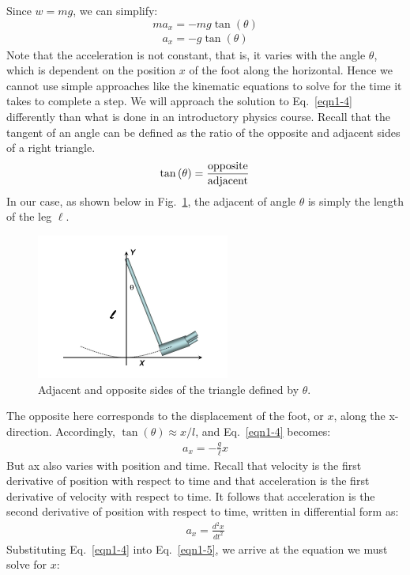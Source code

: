 Since $w=mg$, we can simplify:
$$ma_x = -mg \tan\left(\theta\right)$$       
\begin{eqnarray}\label{eqn1-4}
a_x = -g \tan\left(\theta\right)             
\end{eqnarray}
Note that the acceleration is not constant, that is, it varies with the angle $\theta$, which is dependent on the position $x$ of the foot along the horizontal. Hence we cannot use simple approaches like the kinematic equations to solve for the time it takes to complete a step.  We will approach the solution to Eq.~\ref{eqn1-4} differently than what is done in an introductory physics course. 
Recall that the tangent of an angle can be defined as the ratio of the opposite and adjacent sides of a right triangle.
$$\tan\left(\theta\right)  = \frac{{\rm opposite}}{{\rm adjacent}}$$
In our case, as shown below in Fig.~\ref{Fig1-4}, the adjacent of angle $\theta$ is simply the length of the leg $\ell$. 
\begin{figure}[htb]
	\centering
	\includegraphics[width=2.5in]{./figures/Topic1/Figure1-4.jpg}
	\caption{Adjacent and opposite sides of the triangle defined by $\theta$.}
	\label{Fig1-4}
\end{figure} 
The opposite here corresponds to the displacement of the foot, or $x$, along the x-direction. Accordingly, $\tan\left(\theta\right) \approx x/l$, and Eq.~\ref{eqn1-4} becomes:
\begin{eqnarray}\label{eqn1-5}
a_x = -\frac{g}{\ell}x
\end{eqnarray}             
But ax also varies with position and time.  Recall that velocity is the first derivative of position with respect to time and that acceleration is the first derivative of velocity with respect to time.  It follows that acceleration is the second derivative of position with respect to time, written in differential form as:
\begin{eqnarray}\label{eqn1-6}
a_x = \frac{d^2x}{dt^2}
\end{eqnarray}      
Substituting Eq.~\ref{eqn1-4} into Eq.~\ref{eqn1-5}, we arrive at the equation we must solve for $x$:
